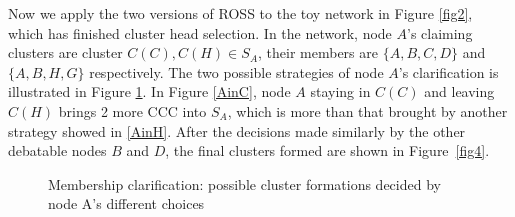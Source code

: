 \documentclass[10pt,journal,compsoc]{IEEEtran}
\theoremstyle{mytheoremstyle}
\theoremstyle{mytheoremstyle}
\theoremstyle{mytheoremstyle}
\begin{document}
Now we apply the two versions of ROSS to the toy network in Figure \ref{fig2}, which has finished cluster head selection.
In the network, node $A$'s claiming clusters are cluster $C(C), C(H)\in S_A$, their members are $\{A,B,C,D\}$ and $\{A,B,H,G\}$ respectively. 
The two possible strategies of node $A$'s clarification is illustrated in Figure \ref{fig3}.
In Figure \ref{AinC}, node $A$ staying in $C(C)$ and leaving $C(H)$ brings 2 more CCC into $S_A$, which is more than that brought by another strategy showed in \ref{AinH}.
After the decisions made similarly by the other debatable nodes $B$ and $D$, the final clusters formed are shown in Figure~\ref{fig4}.



\begin{figure}[h]
\centering
{}
\hspace{.15 in}
\caption[]{Membership clarification: possible cluster formations decided by node A's different choices} %
\label{fig3}
\end{figure}
\end{document}
